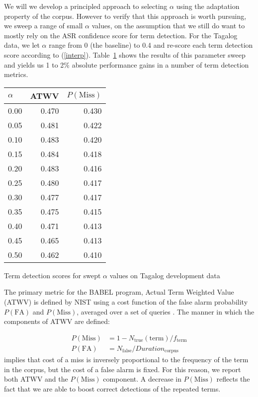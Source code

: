 \documentclass[11pt]{article}
\begin{document}
We will we develop a principled approach to selecting $\alpha$ using the adaptation property of the corpus.  However to verify that this approach is worth pursuing, we sweep a range of small $\alpha$ values, on the assumption that we still do want to mostly rely on the ASR confidence score for term detection.  For the Tagalog data, we let $\alpha$ range from 0 (the baseline) to 0.4 and re-score each term detection score according to (\ref{interp}).  Table~\ref{tagsweep} shows the results of this parameter sweep and yields us 1 to 2\% absolute performance gains in a number of term detection metrics.

\begin{table}[ht]
\centering
\begin{tabular}{l|r|r} \toprule
\bf $\alpha$ & \bf ATWV & \bf $P(\mathrm{Miss})$ \\\midrule
0.00 & 0.470 & 0.430 \\
0.05 & 0.481 & 0.422 \\
0.10 & 0.483 & 0.420 \\
0.15 & 0.484 & 0.418 \\
0.20 & 0.483 &  0.416 \\
0.25 & 0.480 & 0.417 \\
0.30 & 0.477 &  0.417 \\
0.35 & 0.475 & 0.415 \\
0.40 & 0.471 &  0.413 \\
0.45 & 0.465 &  0.413 \\
0.50 & 0.462 & 0.410 \\
\bottomrule
\end{tabular}
\begin{caption}{Term detection scores for swept $\alpha$ values on Tagalog development data}
\label{tagsweep}
\end{caption}
\end{table}

The primary metric for the {\small BABEL} program, Actual Term Weighted Value (ATWV) is defined by NIST using a cost function of the false alarm probability $P(\mathrm{FA})$ and $P(\mathrm{Miss})$, averaged over a set of queries \cite{std06eval}.  The manner in which the components of ATWV are defined:

\begin{align}
P(\mathrm{Miss}) &= 1 - N_{\mathrm{true}}(\mathrm{term}) / f_{\mathrm{term}} \\
P(\mathrm{FA})  &= N_{\mathrm{false}} / Duration_{\mathrm{corpus}}
\end{align}
\noindent implies that cost of a miss is inversely proportional to the frequency of the term in the corpus, but the cost of a false alarm is fixed.   For this reason, we report both ATWV and the $P(\mathrm{Miss})$ component.  A decrease in $P(\mathrm{Miss})$ reflects the fact that we are able to boost correct detections of the repeated terms.
\end{document}
